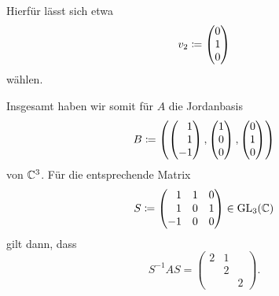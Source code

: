 \documentclass[a4paper,10pt,numbers = noenddot]{scrartcl}
\begin{document}
\begin{example}
\begin{itemize}
\[      \]
      Hierfür lässt sich etwa
      \[
                  v_2
        \coloneqq \begin{pmatrix} 0 \\ 1 \\ 0 \end{pmatrix}
      \]
      wählen.
  \end{itemize}
  Insgesamt haben wir somit für $A$ die Jordanbasis
  \[
              B
    \defined \left(
                \columnrvector{1 \\ 1 \\ -1},
                \columnvector{1 \\ 0 \\ 0},
                \columnvector{0 \\ 1 \\ 0}
              \right)
  \]
  von $\mathbb{C}^3$.
  Für die entsprechende Matrix
  \[
              S
    \defined \begin{pmatrix*}[r]
                 1 &  1 & 0 \\
                 1 &  0 & 1 \\
                -1 &  0 & 0
              \end{pmatrix*}
    \in \GL{3}{\Complex}
  \]
  gilt dann, dass
  \[
      S^{-1} A S
    = \begin{pmatrix}
        2 & 1 &   \\
          & 2 &   \\
          &   & 2
      \end{pmatrix}.
  \]
\end{example}
\end{document}
